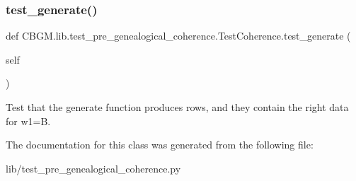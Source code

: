 \subsubsection{\texorpdfstring{test\+\_\+generate()}{test\_generate()}}
{\footnotesize\ttfamily def C\+B\+G\+M.\+lib.\+test\+\_\+pre\+\_\+genealogical\+\_\+coherence.\+Test\+Coherence.\+test\+\_\+generate (\begin{DoxyParamCaption}\item[{}]{self }\end{DoxyParamCaption})}

\begin{DoxyVerb}Test that the generate function produces rows, and they
contain the right data for w1=B.
\end{DoxyVerb}
 

The documentation for this class was generated from the following file\+:\begin{DoxyCompactItemize}
\item 
lib/test\+\_\+pre\+\_\+genealogical\+\_\+coherence.\+py\end{DoxyCompactItemize}
